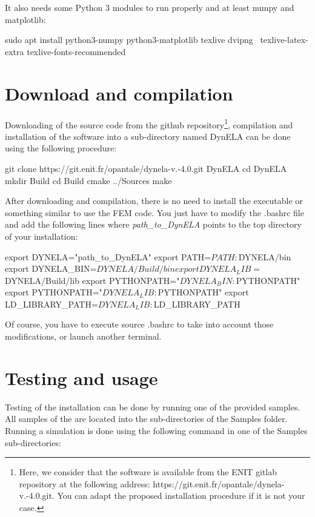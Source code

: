 It also needs some Python 3 modules to run properly and at least numpy and matplotlib:

\begin{BashListing}[numbers=none]
sudo apt install python3-numpy python3-matplotlib texlive dvipng \
texlive-latex-extra texlive-fonts-recommended
\end{BashListing}

\section{Download and compilation}

Downloading of the source code from the github repository\footnote{Here, we consider that the software is available from the ENIT gitlab repository at the following address: https://git.enit.fr/opantale/dynela-v.-4.0.git. You can adapt the proposed installation procedure if it is not your case.}, compilation and installation of the software into a sub-directory named \textsf{DynELA} can be done using the following procedure:

\begin{BashListing}[numbers=none]
git clone https://git.enit.fr/opantale/dynela-v.-4.0.git DynELA
cd DynELA
mkdir Build
cd Build
cmake ../Sources
make
\end{BashListing}

After downloading and compilation, there is no need to install the executable or something similar to use the FEM code. You just have to modify the \textsf{.bashrc} file and add the following lines where \emph{path\_to\_DynELA} points to the top directory of your \DynELA installation:

\begin{BashListing}[numbers=none]
export DYNELA="path_to_DynELA"
export PATH=$PATH:$DYNELA/bin
export DYNELA_BIN=$DYNELA/Build/bin
export DYNELA_LIB=$DYNELA/Build/lib
export PYTHONPATH="$DYNELA_BIN:$PYTHONPATH"
export PYTHONPATH="$DYNELA_LIB:$PYTHONPATH"
export LD_LIBRARY_PATH=$DYNELA_LIB:$LD_LIBRARY_PATH
\end{BashListing}

Of course, you have to execute \textsf{source .bashrc} to take into account those modifications, or launch another terminal.

\section{Testing and usage}

Testing of the installation can be done by running one of the provided samples. All samples of the \DynELA are located into the sub-directories of the Samples folder. Running a simulation is done using the following command in one of the Samples sub-directories:

